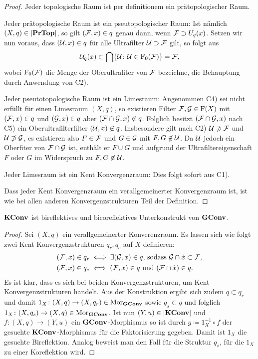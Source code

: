 \begin{proof}
  Jeder topologische Raum ist per definitionem ein prätopologischer Raum.

  Jeder prätopologische Raum ist ein pseutopologischer Raum: 
  Ist nämlich $(X,q) \in |\mathbf{PrTop}|$, so gilt $(\mathcal{F},x) \in q$ genau dann, wenn $\mathcal{F} \supset U_q(x)$. Setzen wir nun voraus, dass $(\mathcal{U},x) \in q$ für alle Ultrafilter $\mathcal{U} \supset \mathcal{F}$ gilt, so folgt aus
  $$
  \mathcal{U}_q(x) \subset \bigcap \{ \mathcal{U} \colon \mathcal{U} \in \mathrm{F}_0(\mathcal{F})\} = \mathcal{F},
  $$
  wobei $\mathrm{F}_0(\mathcal{F})$ die Menge der Oberultrafiter von $\mathcal{F}$ bezeichne, die Behauptung durch Anwendung von C2).

  Jeder pseutotopologische Raum ist ein Limesraum: 
  Angenommen C4) sei nicht erfüllt für einen Limesraum $(X,q)$, so existieren Filter $\mathcal{F},\mathcal{G} \in \mathrm{F}(X)$ mit $(\mathcal{F},x) \in q$ und $(\mathcal{G},x) \in q$ aber $(\mathcal{F} \cap \mathcal{G},x) \not\in q$.
  Folglich besitzt $(\mathcal{F} \cap \mathcal{G}, x)$ nach C5) ein Oberultrafilterfilter $(\mathcal{U},x) \not\in q$.
  Insbesondere gilt nach C2) $\mathcal{U} \not\supset \mathcal{F}$ und $\mathcal{U} \not\supset \mathcal{G}$, es existieren also $F \in \mathcal{F}$ und $G \in \mathcal{G}$ mit $F,G \not \in \mathcal{U}$.
  Da $\mathcal{U}$ jedoch ein Oberfiter von $\mathcal{F} \cap \mathcal{G}$ ist, enthält er $F \cup G$ und aufgrund der Ultrafiltereigenschaft $F$ oder $G$ im Widerspruch zu $F, G \not\in \mathcal{U}$. 

  Jeder Limesraum ist ein Kent Konvergenzraum: Dies folgt sofort aus C1).

  Dass jeder Kent Konvergenzraum ein verallgemeinerter Konvergenzraum ist, ist wie bei allen anderen Konvergenzstrukturen Teil der Definition.
\end{proof}

\begin{prop}
  $\mathbf{KConv}$ ist bireflektives und bicoreflektives Unterkonstrukt von $\mathbf{GConv}$.
\end{prop}

\begin{proof}
  Sei $(X,q)$ ein verallgemeinerter Konverenzraum.
  Es lassen sich wie folgt zwei Kent Konvergenzstrukturen $q_r,q_c$ auf $X$ definieren:
  \begin{align*}
    &(\mathcal{F},x) \in q_r \iff \exists (\mathcal{G}, x) \in q \text{, sodass } \mathcal{G} \cap \dot x \subset \mathcal{F}, \\
    &(\mathcal{F},x) \in q_c \iff (\mathcal{F}, x) \in q \text{ und } (\mathcal{F} \cap \dot x) \in q.
  \end{align*}
  Es ist klar, dass es sich bei beiden Konvergenzstrukturen, um Kent Konvergenzstrukturen handelt.
  Aus der Konstruktion ergibt sich zudem $q \subset q_r$ und damit $1_X \colon (X,q) \to (X, q_r) \in \mathrm{Mor}_{\mathbf{GConv}}$ sowie $q_s \subset q$ und folglich $1_X \colon (X, q_s) \to (X,q) \in \mathrm{Mor}_{\mathbf{GConv}}$.
  Ist nun $(Y,u) \in |\mathbf{KConv}|$ und $f \colon (X, q) \to (Y,u)$ ein $\mathbf{GConv}$-Morphismus so ist durch $g \coloneqq 1_X^{-1} \circ f$ der gesuchte $\mathbf{KConv}$-Morphismus für die Faktorisierung gegeben.
  Damit ist $1_X$ die gesuchte Bireflektion.
  Analog beweist man den Fall für die Struktur $q_s$, für die $1_X$ zu einer Koreflektion wird.
\end{proof}

